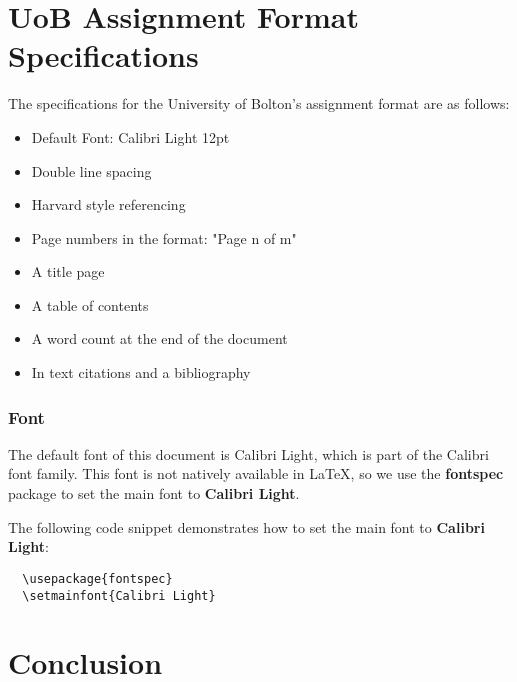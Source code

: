 \documentclass[12pt]{article}
\begin{document}

  \section{UoB Assignment Format Specifications}
  \label{sec:uob-assignment-format-specifications}

  The specifications for the University of Bolton's assignment format are as follows:

  \begin{itemize}
    \item Default Font: Calibri Light 12pt
    \item Double line spacing
    \item Harvard style referencing
    \item Page numbers in the format: "Page n of m"
    \item A title page
    \item A table of contents
    \item A word count at the end of the document
    \item In text citations and a bibliography 
  \end{itemize}


  \subsubsection{Font}
  \label{sec:font}

  The default font of this document is Calibri Light, which is part of the Calibri font family. 
  This font is not natively available in \LaTeX{}, so we use the \textbf{fontspec} package to set the main font to \textbf{Calibri Light}.
  

  The following code snippet demonstrates how to set the main font to \textbf{Calibri Light}:
  
  \begin{verbatim}
  \usepackage{fontspec}
  \setmainfont{Calibri Light}
  \end{verbatim}

  


  \section{Conclusion}
  \label{sec:conclusion}
\end{document}
